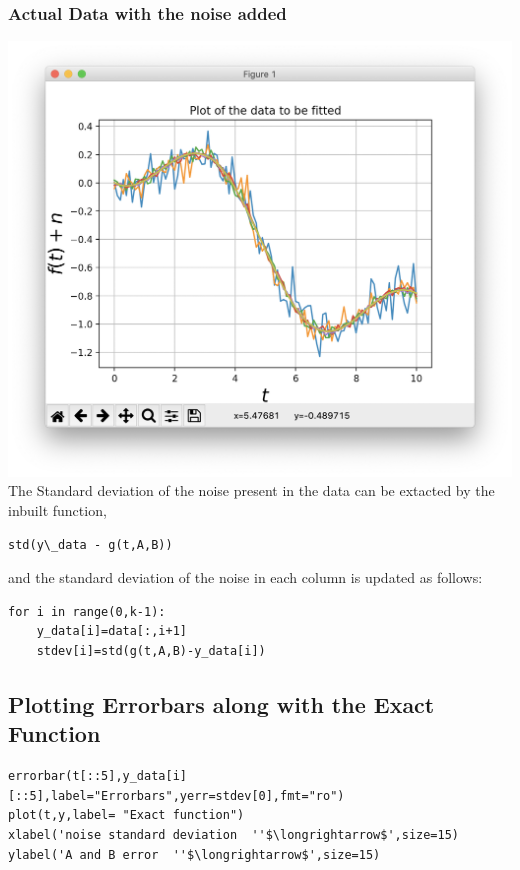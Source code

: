 \documentclass[10pt,english, openany]{book}
\begin{document}
\subsubsection{Actual Data with the noise added}
{\centering\includegraphics[scale=0.4]{scr5.png}}
The Standard deviation of the noise present in the data can be extacted by the inbuilt function, 
\begin{verbatim}
std(y\_data - g(t,A,B))
\end{verbatim}
and the standard deviation of the noise in each column is updated as follows:
\begin{verbatim}
for i in range(0,k-1):
	y_data[i]=data[:,i+1]
	stdev[i]=std(g(t,A,B)-y_data[i])
\end{verbatim}
\subsection{Plotting Errorbars along with the Exact Function}
\begin{verbatim}
errorbar(t[::5],y_data[i][::5],label="Errorbars",yerr=stdev[0],fmt="ro")
plot(t,y,label= "Exact function")
xlabel('noise standard deviation  ''$\longrightarrow$',size=15)
ylabel('A and B error  ''$\longrightarrow$',size=15)
\end{verbatim}
\end{document}
